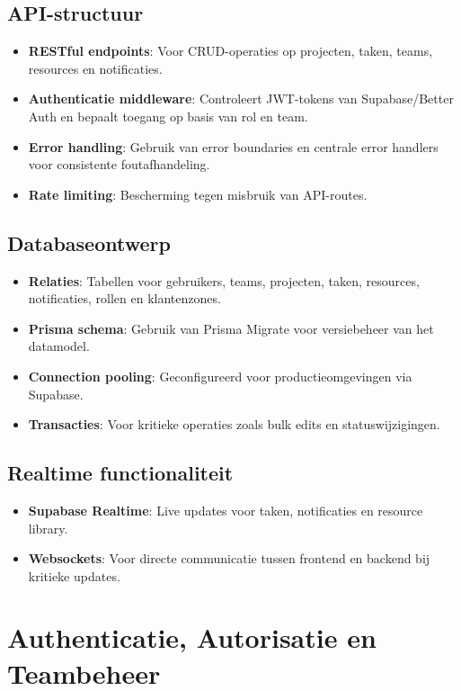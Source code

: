 \subsection{API-structuur}
\begin{itemize}
    \item \textbf{RESTful endpoints}: Voor CRUD-operaties op projecten, taken, teams, resources en notificaties.
    \item \textbf{Authenticatie middleware}: Controleert JWT-tokens van Supabase/Better Auth en bepaalt toegang op basis van rol en team.
    \item \textbf{Error handling}: Gebruik van error boundaries en centrale error handlers voor consistente foutafhandeling.
    \item \textbf{Rate limiting}: Bescherming tegen misbruik van API-routes.
\end{itemize}

\subsection{Databaseontwerp}
\begin{itemize}
    \item \textbf{Relaties}: Tabellen voor gebruikers, teams, projecten, taken, resources, notificaties, rollen en klantenzones.
    \item \textbf{Prisma schema}: Gebruik van Prisma Migrate voor versiebeheer van het datamodel.
    \item \textbf{Connection pooling}: Geconfigureerd voor productieomgevingen via Supabase.
    \item \textbf{Transacties}: Voor kritieke operaties zoals bulk edits en statuswijzigingen.
\end{itemize}

\subsection{Realtime functionaliteit}
\begin{itemize}
    \item \textbf{Supabase Realtime}: Live updates voor taken, notificaties en resource library.
    \item \textbf{Websockets}: Voor directe communicatie tussen frontend en backend bij kritieke updates.
\end{itemize}

\section{Authenticatie, Autorisatie en Teambeheer}
\label{sec:auth-teams}

